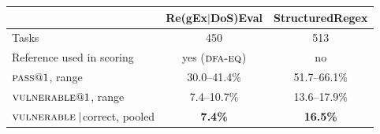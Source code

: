 \begin{tabular}{lcc}
\toprule
 & Re(gEx$|$DoS)Eval & StructuredRegex \\
\midrule
Tasks & 450 & 513 \\
Reference used in scoring     & yes ($\textsc{dfa-eq}{}$) & no \\
\midrule
$\textsc{pass}{}@1$, range & 30.0--41.4\% & 51.7--66.1\% \\
$\textsc{vulnerable}{}@1$, range & 7.4--10.7\% & 13.6--17.9\% \\
$\textsc{vulnerable}{}\mid$correct, pooled & \textbf{7.4\%} & \textbf{16.5\%} \\
\bottomrule
\end{tabular}
